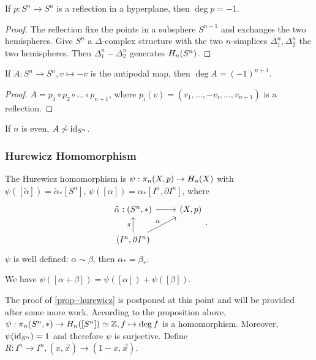 \documentclass[a4paper,11pt]{article}
\begin{document}
			\begin{prop}
				If $p:S^n\rightarrow S^n$ is a reflection in a hyperplane, then $\deg p=-1$.
			\end{prop}
			\begin{proof}
				The reflection fixe the points in a subsphere $S^{n-1}$ and exchanges the two hemispheres. Give $S^n$ a $\Delta$-complex structure with the two $n$-simplices $\Delta_1^n,\Delta_2^n$ the two hemispheres. Then $\Delta_1^n-\Delta_2^n$ generates $\hg[n]{S^n}$.
			\end{proof}

			\begin{cor}
				If $A:S^n\rightarrow S^n, v\mapsto -v$ is the antipodal map, then $\deg A=(-1)^{n+1}$.
			\end{cor}
			\begin{proof}
				$A=p_1\circ p_2\circ \dots\circ p_{n+1}$, where $p_i(v)=(v_1,\dots,-v_i,\dots,v_{n+1})$ is a reflection.
			\end{proof}

			\begin{cor}
				If $n$ is even, $A\not\sim\id_{S^n}$.
			\end{cor}

			\subsubsection*{Hurewicz Homomorphism}
				\begin{defi}
					The Hurewicz homomorphism is $\psi:\pi_n(X,p)\rightarrow \hg[n]{X}$ with $\psi([\tilde{\alpha}])=\tilde{\alpha}_\ast[S^n]$, $\psi([\alpha])=\alpha_\ast[I^n,\partial I^n]$, where
					\begin{equation*}
						\begin{tikzcd}
							\tilde{\alpha}:(S^n,\ast)\ar[r]& (X,p)\\
							(I^n,\partial I^n)\ar[u,"\pi"]\ar[ur,"\alpha"]&
						\end{tikzcd}.
					\end{equation*}
					$\psi$ is well defined: $\alpha\sim\beta$, then $\alpha_\ast=\beta_\ast$.
				\end{defi}
			
				\begin{prop}\label{prop--hurewicz}
					We have $\psi([\alpha+\beta])=\psi([\alpha])+\psi([\beta])$.
				\end{prop}
				
				The proof of \autoref{prop--hurewicz} is postponed at this point and will be provided after some more work. 
				According to the proposition above, $\psi:\pi_n(S^n,\ast)\rightarrow\hg[n]{[S^n]}\simeq\Z, f\mapsto\deg f$ is a homomorphism. Moreover, $\psi(\id_{S^n})=1$ and therefore $\psi$ is surjective. Define $R:I^n\rightarrow I^n, (x,\vec{x})\rightarrow(1-x,\vec{x})$.
\end{document}
